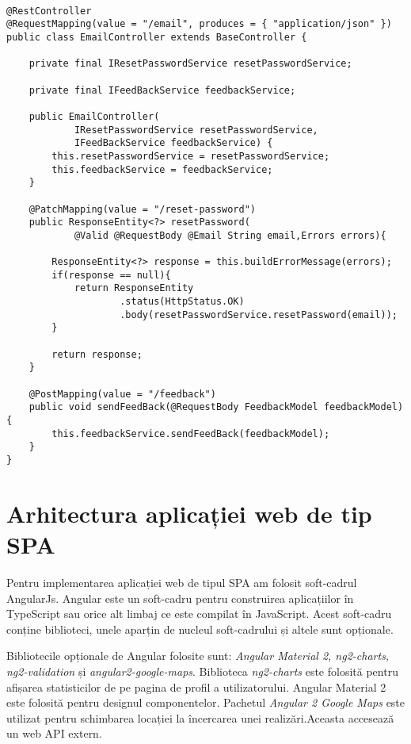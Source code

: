 \begin {lstlisting}

@RestController
@RequestMapping(value = "/email", produces = { "application/json" })
public class EmailController extends BaseController {

	private final IResetPasswordService resetPasswordService;
		
	private final IFeedBackService feedbackService;
	
	public EmailController(
			IResetPasswordService resetPasswordService,
			IFeedBackService feedbackService) {
		this.resetPasswordService = resetPasswordService;
		this.feedbackService = feedbackService;
	}
	
	@PatchMapping(value = "/reset-password")
    public ResponseEntity<?> resetPassword(
    		@Valid @RequestBody @Email String email,Errors errors){
		
		ResponseEntity<?> response = this.buildErrorMessage(errors);
		if(response == null){
    		return ResponseEntity
					.status(HttpStatus.OK)
					.body(resetPasswordService.resetPassword(email));
		}
		
		return response;
	}
	
	@PostMapping(value = "/feedback")
	public void sendFeedBack(@RequestBody FeedbackModel feedbackModel){
		this.feedbackService.sendFeedBack(feedbackModel);
	}	
}

\end{lstlisting}

\section{Arhitectura aplicației web de tip SPA}

Pentru implementarea aplicației web de tipul SPA am folosit soft-cadrul AngularJs.
Angular este un soft-cadru pentru construirea aplicațiilor în TypeScript sau orice alt 
limbaj ce este compilat în JavaScript.
Acest soft-cadru conține biblioteci, unele aparțin de nucleul soft-cadrului și altele sunt
opționale. 

	Bibliotecile opționale de Angular folosite sunt: \textit{Angular Material 2, ng2-charts, ng2-validation} și \textit{angular2-google-maps}.
Biblioteca \textit{ng2-charts} este folosită pentru afișarea statisticilor de pe pagina de profil a utilizatorului. 
Angular Material 2 este folosită pentru designul componentelor. Pachetul \textit{Angular 2 Google Maps} este utilizat pentru schimbarea locației la încercarea 
unei realizări.Aceasta accesează un web API extern. 

